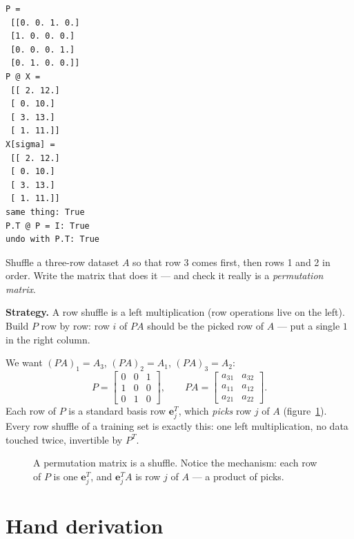\begin{lstlisting}[caption={Output of listing~\ref{lst:perm}. $P@X$ is exactly fancy-indexing \texttt{X[sigma]}; $P^{T}P=I$ because a permutation never duplicates or drops a row.}]
P =
 [[0. 0. 1. 0.]
 [1. 0. 0. 0.]
 [0. 0. 0. 1.]
 [0. 1. 0. 0.]]
P @ X =
 [[ 2. 12.]
 [ 0. 10.]
 [ 3. 13.]
 [ 1. 11.]]
X[sigma] =
 [[ 2. 12.]
 [ 0. 10.]
 [ 3. 13.]
 [ 1. 11.]]
same thing: True
P.T @ P = I: True
undo with P.T: True
\end{lstlisting}

\begin{example}\label{ex:perm}
Shuffle a three-row dataset $A$ so that row 3 comes first, then rows 1
and 2 in order. Write the matrix that does it --- and check it really is
a \emph{permutation matrix}.
\par\smallskip
\textbf{Strategy.} A row shuffle is a left multiplication (row
operations live on the left). Build $P$ row by row: row $i$ of $PA$
should be the picked row of $A$ --- put a single $1$ in the right
column.
\begin{solution}
We want $(PA)_1=A_3$, $(PA)_2=A_1$, $(PA)_3=A_2$:
\[
  P=\begin{bmatrix}0&0&1\\1&0&0\\0&1&0\end{bmatrix},\qquad
  PA=\begin{bmatrix}a_{31}&a_{32}\\a_{11}&a_{12}\\a_{21}&a_{22}\end{bmatrix}.
\]
Each row of $P$ is a standard basis row $\mathbf{e}_j^{T}$, which
\emph{picks} row $j$ of $A$ (figure~\ref{fig:perm}). Every row shuffle
of a training set is exactly this: one left multiplication, no data
touched twice, invertible by $P^{T}$. \checkmark
\end{solution}
\end{example}

\begin{figure}[htbp]\centering

\caption{A permutation matrix is a shuffle. Notice the mechanism: each
row of $P$ is one $\mathbf{e}_j^{T}$, and $\mathbf{e}_j^{T}A$ is row
$j$ of $A$ --- a product of picks.}
\label{fig:perm}
\end{figure}

\section{Hand derivation}\label{sec:handderiv2}

